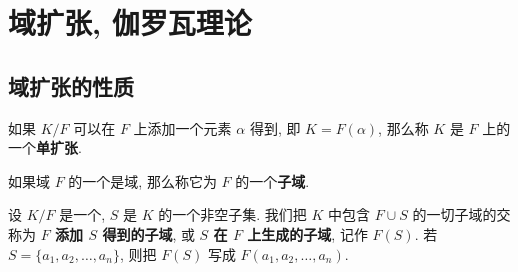 \chapter{域扩张, 伽罗瓦理论}

\section{域扩张的性质}

\begin{definition}\label{子域}\label{单扩张}
	如果 $K/F$ 可以在 $F$ 上添加一个元素 $\alpha$ 得到, 即 $K=F(\alpha)$, 那么称 $K$ 是 $F$ 上的一个\textbf{单扩张}.
	
	如果域 $F$ 的一个是域, 那么称它为 $F$ 的一个\textbf{子域}.
\end{definition}

\begin{definition}
	设 $K/F$ 是一个, $S$ 是 $K$ 的一个非空子集. 我们把 $K$ 中包含 $F\cup S$ 的一切子域的交称为\textbf{ $F$ 添加 $S$ 得到的子域}, 或\textbf{ $S$ 在 $F$ 上生成的子域}, 记作 $F(S)$. 若 $S=\{a_1,a_2,\ldots,a_n\}$, 则把 $F(S)$ 写成 $F(a_1,a_2,\ldots,a_n)$.
\end{definition}